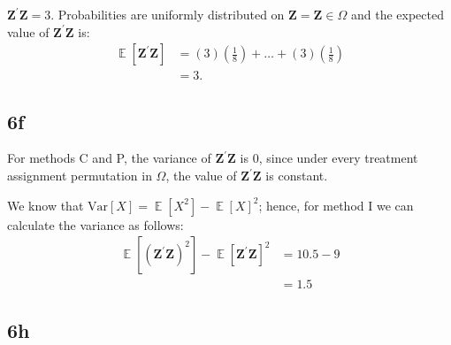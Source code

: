 \documentclass[
  12pt,
  leqno]{article}
\DeclareMathOperator{\E}{\mathbb{E}}
\begin{document}
\(\mathbf{Z}^{\prime}\mathbf{Z} = 3\). Probabilities are uniformly
distributed on \(\mathbf{Z} = \mathbf{Z} \in \Omega\) and the expected
value of \(\mathbf{Z}^{\prime}\mathbf{Z}\) is: \begin{align*}
\E\left[\mathbf{Z}^{\prime}\mathbf{Z}\right] & = \left(3\right)\left(\frac{1}{8}\right) + \dots + \left(3\right)\left(\frac{1}{8}\right) \\
& = 3.
\end{align*}

\subsection*{6f}

For methods C and P, the variance of \(\mathbf{Z}^{\prime} \mathbf{Z}\)
is \(0\), since under every treatment assignment permutation in
\(\Omega\), the value of \(\mathbf{Z}^{\prime}\mathbf{Z}\) is constant.

We know that
\(\mathrm{Var}\left[X\right] = \E\left[X^2\right] - \E\left[X\right]^2\);
hence, for method I we can calculate the variance as follows:
\begin{align*}
\E\left[\left(\mathbf{Z}^{\prime}\mathbf{Z}\right)^2\right] - \E\left[\mathbf{Z}^{\prime}\mathbf{Z}\right]^2 & = 10.5 - 9 \\
& = 1.5
\end{align*}

\subsection*{6h}
\end{document}
